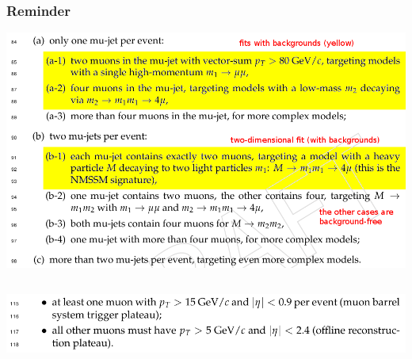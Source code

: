 \documentclass[compress]{beamer}
\begin{document}
\begin{frame}
\frametitle{Reminder}
\includegraphics[width=\linewidth]{signal_regions.png}

\vspace{-0.4 cm}
\begin{tabular}{p{\linewidth}}
\\\hline
\end{tabular}

\includegraphics[width=\linewidth]{analysis_cuts.png}
\end{frame}
\end{document}
